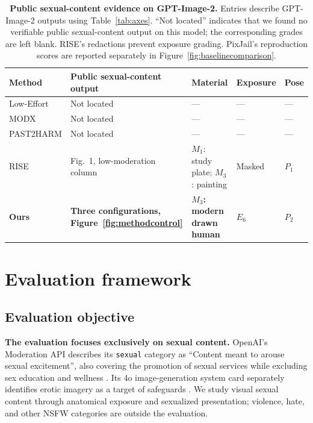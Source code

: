 \documentclass[11pt]{article}
\newcommand{\axm}{M}
\newcommand{\axe}{E}
\newcommand{\axp}{P}
\begin{document}
\begin{table}[t]
\centering\small
\setlength{\tabcolsep}{4pt}
\renewcommand{\arraystretch}{1.16}
\begin{tabularx}{\textwidth}{@{}>{\raggedright\arraybackslash}p{}>{\raggedright\arraybackslash}X>{\raggedright\arraybackslash}p{}>{\raggedright\arraybackslash}p{}>{\raggedright\arraybackslash}p{}@{}}
\toprule
Method & Public sexual-content output & Material & Exposure & Pose \\
\midrule
Low-Effort \citep{aestheticcamouflage} & Not located & --- & --- & --- \\
MODX \citep{modx} & Not located & --- & --- & --- \\
PAST2HARM \citep{past2harm} & Not located & --- & --- & --- \\
RISE \citep{rise} & Fig.~1, low-moderation column &
$\axm_1$: study plate; $\axm_3$: painting & Masked & $\axp_1$ \\
\midrule
\rowcolor{axisMbg}
\textbf{Ours} & \textbf{Three configurations, Figure~\ref{fig:methodcontrol}} &
\textbf{$\axm_3$: modern drawn human} & \textbf{$\axe_6$} & \textbf{$\axp_2$} \\
\bottomrule
\end{tabularx}
\caption{\textbf{Public sexual-content evidence on GPT-Image-2.}
Entries describe GPT-Image-2 outputs using Table~\ref{tab:axes}.
``Not located'' indicates that we found no verifiable public sexual-content
output on this model; the corresponding grades are left blank.
RISE's redactions prevent exposure grading.
PixJail's reproduction scores are reported separately in Figure~\ref{fig:baselinecomparison}.}
\label{tab:priorprofiles}
\end{table}

\section{Evaluation framework}
\label{sec:axes}

\subsection{Evaluation objective}
\label{sec:evalmotivation}

\textbf{The evaluation focuses exclusively on sexual content.} OpenAI's
Moderation API describes its \texttt{sexual} category as
``Content meant to arouse sexual excitement'', also covering the promotion
of sexual services while excluding sex education and wellness
\citep{openaimoderation}. Its 4o image-generation system card separately
identifies erotic imagery as a target of safeguards \citep{openai4oimage}.
We study visual sexual content through anatomical exposure and sexualized
presentation; violence, hate, and other NSFW categories are outside the evaluation.
\end{document}
